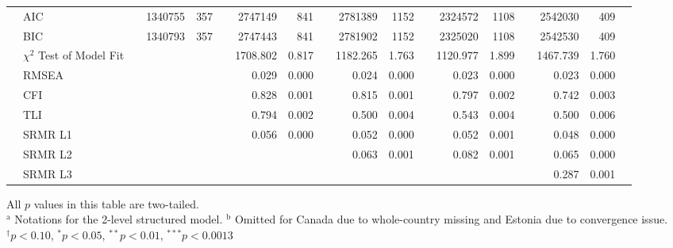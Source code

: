 {\begin{tabular}{l @{\hskip -8.1cm} l c rr l rr l rr l rr l rr l}
    \cmidrule{4-5}\cmidrule{7-8}\cmidrule{10-11}\cmidrule{13-14}\cmidrule{16-17}          & AIC   && 1340755 & 357   &       & 2747149 & 841   &       & 2781389 & 1152  &       & 2324572 & 1108  &       & 2542030 & 409   &  \\
              & BIC   && 1340793 & 357   &       & 2747443 & 841   &       & 2781902 & 1152  &       & 2325020 & 1108  &       & 2542530 & 409   &  \\
              & $\chi^2$ Test of Model Fit &&       &       &       & 1708.802 & 0.817 &       & 1182.265 & 1.763 &       & 1120.977 & 1.899 &       & 1467.739 & 1.760 &  \\
              & RMSEA &&       &       &       & 0.029 & 0.000 &       & 0.024 & 0.000 &       & 0.023 & 0.000 &       & 0.023 & 0.000 &  \\
              & CFI   &&       &       &       & 0.828 & 0.001 &       & 0.815 & 0.001 &       & 0.797 & 0.002 &       & 0.742 & 0.003 &  \\
              & TLI   &&       &       &       & 0.794 & 0.002 &       & 0.500 & 0.004 &       & 0.543 & 0.004 &       & 0.500 & 0.006 &  \\
              & SRMR L1 &&       &       &       & 0.056 & 0.000 &       & 0.052 & 0.000 &       & 0.052 & 0.001 &       & 0.048 & 0.000 &  \\
              & SRMR L2 &&       &       &       &       &       &       & 0.063 & 0.001 &       & 0.082 & 0.001 &       & 0.065 & 0.000 &  \\
              & SRMR L3 &&       &       &       &       &       &       &       &       &       &       &       &       & 0.287 & 0.001 &  \\
        \bottomrule
    \end{tabular}
}{All $p$ values in this table are two-tailed. \\
$^\text{a}$ Notations for the 2-level structured model.
$^\text{b}$ Omitted for Canada due to whole-country missing and Estonia due to convergence issue.\\
$^\dagger p < 0.10$, $^* p < 0.05$, $^{**} p < 0.01$, $^{***} p < 0.001$}{3}
